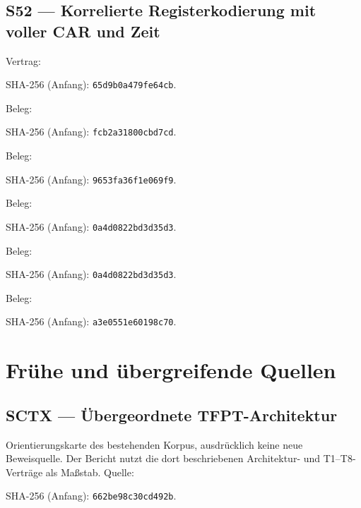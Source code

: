 \documentclass[11pt,a4paper,oneside,parskip=half,headings=normal,numbers=noenddot,bibliography=totoc]{scrreprt}
\begin{document}
\subsection*{S52 — Korrelierte Registerkodierung mit voller CAR und Zeit}\label{s:52}
{\small{}\par}
Vertrag: \par
{\footnotesize SHA-256 (Anfang): \texttt{65d9b0a479fe64cb}.}\par
Beleg: \par
{\footnotesize SHA-256 (Anfang): \texttt{fcb2a31800cbd7cd}.}\par
Beleg: \par
{\footnotesize SHA-256 (Anfang): \texttt{9653fa36f1e069f9}.}\par
Beleg: \par
{\footnotesize SHA-256 (Anfang): \texttt{0a4d0822bd3d35d3}.}\par
Beleg: \par
{\footnotesize SHA-256 (Anfang): \texttt{0a4d0822bd3d35d3}.}\par
Beleg: \par
{\footnotesize SHA-256 (Anfang): \texttt{a3e0551e60198c70}.}\par
\section{Frühe und übergreifende Quellen}
\subsection*{SCTX — Übergeordnete TFPT-Architektur}\label{s:CTX}
Orientierungskarte des bestehenden Korpus, ausdrücklich keine neue Beweisquelle. Der Bericht nutzt die dort beschriebenen Architektur- und T1--T8-Verträge als Maßstab.
Quelle: \par{\footnotesize SHA-256 (Anfang): \texttt{662be98c30cd492b}.}\par
\end{document}
